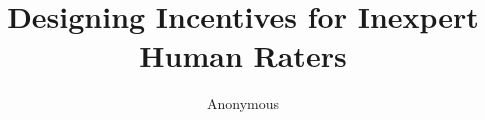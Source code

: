 \documentclass{chi2009}
\begin{document}
\setlength{\paperheight}{11in}
\setlength{\paperwidth}{8.5in}
\setlength{\pdfpageheight}{\paperheight}
\setlength{\pdfpagewidth}{\paperwidth}


\title{Designing Incentives for Inexpert Human Raters} 



\author{
\alignauthor Anonymous
}


\maketitle
\end{document}
